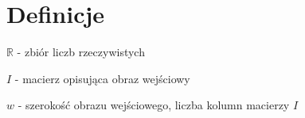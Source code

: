 \chapter{Definicje}
\begin{list}{}{\leftmargin=0em}

\item $\mathbb{R}$ - zbiór liczb rzeczywistych
\item $I$ - macierz opisująca obraz wejściowy
\item $w$ - szerokość obrazu wejściowego, liczba kolumn macierzy $I$


\end{list}
